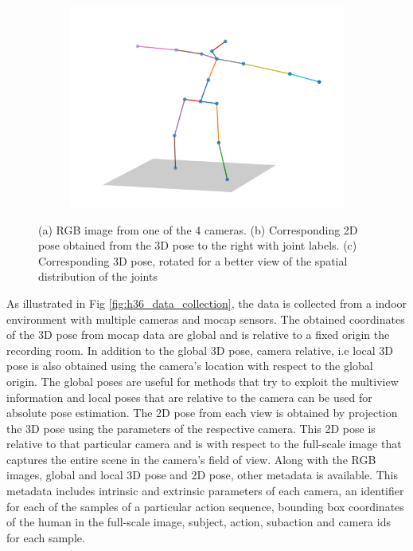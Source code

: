 \begin{figure}
\begin{subfigure}[b]{0.3\textwidth}
        \caption{}
    \end{subfigure}
    \hfill
    \begin{subfigure}[b]{0.3\textwidth}
        \centering
        \includegraphics[width=\textwidth]{figures/h36_viz/h363d.png}
        \caption{}
    \end{subfigure}

    \caption{(a) RGB image from one of the 4 cameras. (b) Corresponding 2D pose obtained from the 3D pose to the right with joint labels. (c) Corresponding 3D pose, rotated for a better view of the spatial distribution of the joints}

    \label{fig:h36_sample}
\end{figure}

As illustrated in Fig \ref{fig:h36_data_collection}, the data is collected from a indoor environment with multiple cameras and \ac{mocap} sensors. The obtained coordinates of the 3D pose from \ac{mocap} data are global and is relative to a fixed origin the recording room. In addition to the global 3D pose, camera relative, i.e local 3D pose is also obtained using the camera's location with respect to the global origin. The global poses are useful for methods that try to exploit the multiview information and local poses that are relative to the camera can be used for absolute pose estimation. The 2D pose from each view is obtained by projection the 3D pose using the parameters of the respective camera. This 2D pose is relative to that particular camera and is with respect to the full-scale image that captures the entire scene in the camera's field of view. Along with the RGB images, global and local 3D pose and 2D pose, other metadata is available. This metadata includes intrinsic and extrinsic parameters of each camera, an identifier for each of the samples of a particular action sequence, bounding box coordinates of the human in the full-scale image, subject, action, subaction and camera ids for each sample. 

